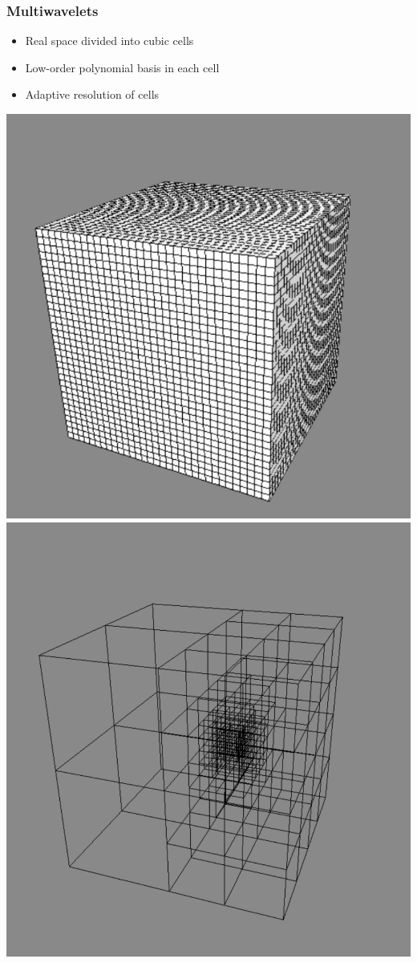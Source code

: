 \documentclass[mathserif]{beamer}
\begin{document}
\begin{frame}
    \frametitle{Multiwavelets}
    \begin{itemize}
    	\item Real space divided into cubic cells
	\item Low-order polynomial basis in each cell
	\item Adaptive resolution of cells
    \end{itemize}
    \begin{center} 
	\includegraphics[scale=0.25]{figures/unifgrid.pdf}
	\includegraphics[scale=0.1495]{figures/adapgrid.pdf}
    \end{center}
\end{frame}
\end{document}
